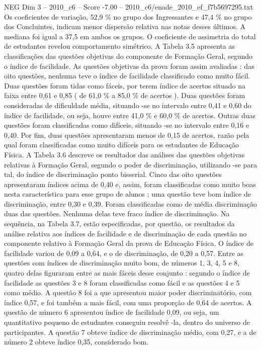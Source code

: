 \begin{textsample}{NEG Dim 3 – 2010\_c6 – Score -7.00 – 2010\_c6/enade\_2010\_ef\_f7b5697295.txt}
Os coeficientes de variação, 52,9 \% no grupo dos Ingressantes e 47,4 \% no grupo dos Concluintes, indicam menor dispersão relativa nas notas desses últimos.
A mediana foi igual a 37,5 em ambos os grupos.
O coeficiente de assimetria do total de estudantes revelou comportamento simétrico.
A Tabela 3.5 apresenta as classificações das questões objetivas do componente de Formação Geral, segundo o índice de facilidade.
As questões objetivas da prova foram assim avaliadas : das oito questões, nenhuma teve o índice de facilidade classificado como muito fácil.
Duas questões foram tidas como fáceis, por terem índice de acertos situado na faixa entre 0,61 e 0,85 ( de 61,0 \% a 85,0 \% de acertos ).
Duas questões foram consideradas de dificuldade média, situando -se no intervalo entre 0,41 e 0,60 do índice de facilidade, ou seja, houve entre 41,0 \% e 60,0 \% de acertos.
Outras duas questões foram classificadas como difíceis, situando -se no intervalo entre 0,16 e 0,40.
Por fim, duas questões apresentaram menos de 0,15 de acertos, razão pela qual foram classificadas como muito difíceis para os estudantes de Educação Física.
A Tabela 3.6 descreve os resultados das análises das questões objetivas relativas à Formação Geral, segundo o poder de discriminação, utilizando -se para tal, do índice de discriminação ponto bisserial.
Cinco das oito questões apresentaram índices acima de 0,40 e, assim, foram classificadas como muito boas nesta característica para esse grupo de alunos ; uma questão teve bom índice de discriminação, entre 0,30 e 0,39.
Foram classificadas como de média discriminação duas das questões.
Nenhuma delas teve fraco índice de discriminação.
Na sequência, na Tabela 3.7, estão especificadas, por questão, os resultados da análise relativa aos índices de facilidade e de discriminação de cada questão no componente relativo à Formação Geral da prova de Educação Física.
O índice de facilidade variou de 0,09 a 0,64, e o de discriminação, de 0,20 a 0,57.
Entre as questões com índices de discriminação muito bom, de números 1, 3, 4, 5 e 8, quatro delas figuraram entre as mais fáceis desse conjunto : segundo o índice de facilidade as questões 3 e 8 foram classificadas como fácil e as questões 4 e 5 como médio.
A questão 8 foi a que apresentou maior poder discriminatório, com índice 0,57, e foi também a mais fácil, com uma proporção de 0,64 de acertos.
A questão de número 6 apresentou índice de facilidade 0,09, ou seja, um quantitativo pequeno de estudantes conseguiu resolvê -la, dentro do universo de participantes.
A questão 7 obteve índice de discriminação médio, com 0,27, e a de número 2 obteve índice 0,35, considerado bom.

\end{textsample}
